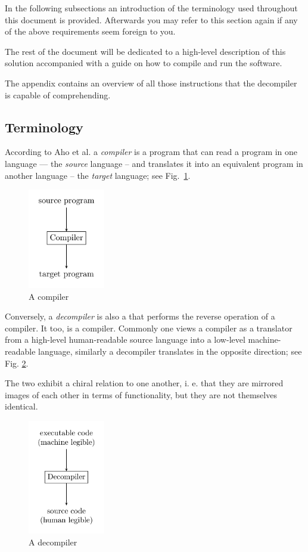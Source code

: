 \documentclass[a4paper]{article}
\begin{document}
In the following subsections an introduction of the terminology used
throughout this document is provided. Afterwards you may refer to this
section again if any of the above requirements seem foreign to you.

The rest of the document will be dedicated to a high-level description
of this solution accompanied with a guide on how to compile and run
the software.

The appendix contains an overview of all those instructions that the
decompiler is capable of comprehending.

\subsection{Terminology}

According to Aho et al.\cite{Aho:2006:CPT:1177220} a \emph{compiler} is a program that
can read a program in one language --- the \emph{source} language --
and translates it into an equivalent program in another language --
the \emph{target} language; see Fig.~\ref{fig:compiler}.

\begin{figure}[H]
  \centering
  \includegraphics[width=0.3\textwidth]{figures/compiler.png}
  \caption{A compiler}
  \label{fig:compiler}
\end{figure}

Conversely, a \emph{decompiler} is also a that performs the reverse
operation of a compiler. It too, is a compiler. Commonly one views a
compiler as a translator from a high-level human-readable source
language into a low-level machine-readable language, similarly a
decompiler translates in the opposite direction; see
Fig. \ref{fig:decompiler}. 

The two exhibit a chiral relation to one another, i. e. that they are
mirrored images of each other in terms of functionality, but they are
not themselves identical.

\begin{figure}[H]
  \centering
  \includegraphics[width=0.3\textwidth]{figures/decompiler.png}
  \caption{A decompiler}
  \label{fig:decompiler}
\end{figure}
\end{document}
